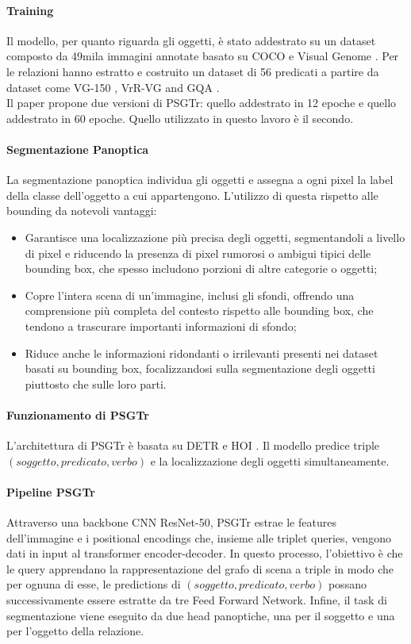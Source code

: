 \paragraph*{Training}
Il modello, per quanto riguarda gli oggetti, è stato addestrato su un dataset composto da 49mila immagini annotate basato su COCO \cite{coco} e Visual Genome \cite{visualgenemo}. Per le relazioni hanno estratto e costruito un dataset di 56 predicati a partire da dataset come VG-150 \cite{vg150}, VrR-VG \cite{vrvvg} and GQA \cite{cqa}.\\
Il paper propone due versioni di PSGTr: quello addestrato in 12 epoche e quello addestrato in 60 epoche. Quello utilizzato in questo lavoro è il secondo.

\paragraph*{Segmentazione Panoptica}
La segmentazione panoptica individua gli oggetti e assegna a ogni pixel la label della classe dell'oggetto a cui appartengono. L'utilizzo di questa rispetto alle bounding da notevoli vantaggi:
\begin{itemize}
	\item Garantisce una localizzazione più precisa degli oggetti, segmentandoli a livello di pixel e riducendo la presenza di pixel rumorosi o ambigui tipici delle bounding box, che spesso includono porzioni di altre categorie o oggetti;
	\item Copre l'intera scena di un'immagine, inclusi gli sfondi, offrendo una comprensione più completa del contesto rispetto alle bounding box, che tendono a trascurare importanti informazioni di sfondo;
	\item Riduce anche le informazioni ridondanti o irrilevanti presenti nei dataset basati su bounding box, focalizzandosi sulla segmentazione degli oggetti piuttosto che sulle loro parti.
\end{itemize}
\paragraph*{Funzionamento di PSGTr}
L'architettura di PSGTr è basata su DETR \cite{detr} e HOI \cite{hoi}. Il modello predice triple $(soggetto, predicato, verbo)$ e la localizzazione degli oggetti simultaneamente.
\paragraph*{Pipeline PSGTr}
Attraverso una \gls{backbone} CNN ResNet-50, PSGTr estrae le features dell'immagine e i positional encodings che, insieme alle triplet queries, vengono dati in input al transformer encoder-decoder. In questo processo, l'obiettivo è che le query apprendano la rappresentazione del grafo di scena a triple in modo che per ognuna di esse, le predictions di  $(soggetto, predicato, verbo)$ possano successivamente essere estratte da tre Feed Forward Network. Infine, il task di segmentazione viene eseguito da due head panoptiche, una per il soggetto e una per l'oggetto della relazione.

